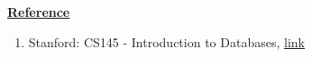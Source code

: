 \documentclass[12pt]{article}
\begin{document}
\bigskip

\underline{\textbf{Reference}}

\bigskip

\begin{enumerate}[1)]
    \item Stanford: CS145 - Introduction to Databases, \href{http://infolab.stanford.edu/~ullman/fcdb/aut07/index.html}{link}
\end{enumerate}
\end{document}
